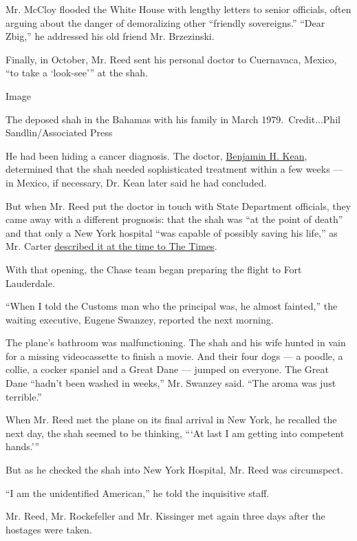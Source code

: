 Mr. McCloy flooded the White House with lengthy letters to senior
officials, often arguing about the danger of demoralizing other
``friendly sovereigns.'' ``Dear Zbig,'' he addressed his old friend Mr.
Brzezinski.

Finally, in October, Mr. Reed sent his personal doctor to Cuernavaca,
Mexico, ``to take a `look-see''' at the shah.

Image

The deposed shah in the Bahamas with his family in March
1979.~Credit...Phil Sandlin/Associated Press

He had been hiding a cancer diagnosis. The doctor,
\href{https://www.nytimes.com/1993/09/26/obituaries/benjamin-h-kean-shah-s-physician-dies-at-81.html}{Benjamin
H. Kean}, determined that the shah needed sophisticated treatment within
a few weeks --- in Mexico, if necessary, Dr. Kean later said he had
concluded.

But when Mr. Reed put the doctor in touch with State Department
officials, they came away with a different prognosis: that the shah was
``at the point of death'' and that only a New York hospital ``was
capable of possibly saving his life,'' as Mr. Carter
\href{https://www.nytimes.com/1981/05/17/magazine/why-carter-admitted-the-shah.html}{described
it at the time to The Times}.

With that opening, the Chase team began preparing the flight to Fort
Lauderdale.

``When I told the Customs man who the principal was, he almost
fainted,'' the waiting executive, Eugene Swanzey, reported the next
morning.

The plane's bathroom was malfunctioning. The shah and his wife hunted in
vain for a missing videocassette to finish a movie. And their four dogs
--- a poodle, a collie, a cocker spaniel and a Great Dane --- jumped on
everyone. The Great Dane ``hadn't been washed in weeks,'' Mr. Swanzey
said. ``The aroma was just terrible.''

When Mr. Reed met the plane on its final arrival in New York, he
recalled the next day, the shah seemed to be thinking, ```At last I am
getting into competent hands.'''

But as he checked the shah into New York Hospital, Mr. Reed was
circumspect.

``I am the unidentified American,'' he told the inquisitive staff.

Mr. Reed, Mr. Rockefeller and Mr. Kissinger met again three days after
the hostages were taken.

